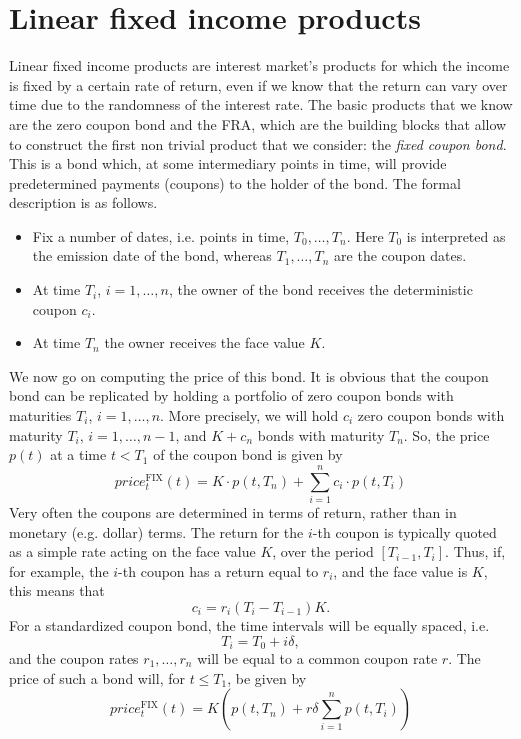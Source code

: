 \section{Linear fixed income products}
Linear fixed income products are interest market's products for which the income is fixed by a certain rate of return, even if we know that the return can vary over time due to the randomness of the interest rate. The basic products that we know are the zero coupon bond and the FRA, which are the building blocks that allow to construct the first non trivial product that we consider: the \emph{fixed coupon bond}. This is a bond which, at some intermediary points in time, will provide predetermined payments (coupons) to the holder of the bond. The formal description is as follows.
\begin{itemize}
    \item Fix a number of dates, i.e. points in time, $T_0, \dots, T_n$. Here $T_0$ is interpreted as the emission date of the bond, whereas $T_1, \dots, T_n$ are the coupon dates.
    \item At time $T_i$, $i = 1,\dots, n$, the owner of the bond receives the deterministic
    coupon $c_i$.
    \item At time $T_n$ the owner receives the face value $K$.
\end{itemize}
We now go on computing the price of this bond. It is obvious that the coupon bond can be replicated by holding a portfolio of zero coupon bonds with maturities $T_i$, $i = 1,\dots, n$. More precisely, we will hold $c_i$ zero coupon bonds with maturity $T_i$, $i = 1,\dots, n-1$, and $K+c_n$ bonds with maturity $T_n$. So, the price $p(t)$ at a time $t < T_1$ of the coupon bond is given by
\begin{equation}
    price_t^{\text{FIX}}(t) = K\cdot p(t,T_n) + \sum_{i=1}^n c_i\cdot p(t,T_i)
\end{equation}
Very often the coupons are determined in terms of return, rather than in monetary (e.g. dollar) terms. The return for the $i$-th coupon is typically quoted as a simple rate acting on the face value $K$, over the period $[T_{i-1},T_i]$. Thus, if, for example, the $i$-th coupon has a return equal to $r_i$, and the face value is $K$, this means that
\begin{equation*}
    c_i = r_i(T_i - T_{i-1})K.
\end{equation*}
For a standardized coupon bond, the time intervals will be equally spaced, i.e.
\begin{equation*}
    T_i = T_0 + i\delta,
\end{equation*}
and the coupon rates $r_1,\dots,r_n$ will be equal to a common coupon rate $r$. The
price of such a bond will, for $t \le T_1$, be given by
\begin{equation}
    price_t^{\text{FIX}}(t) = K\left(p(t,T_n) + r\delta\sum_{i=1}^n p(t,T_i)\right)
\end{equation}

